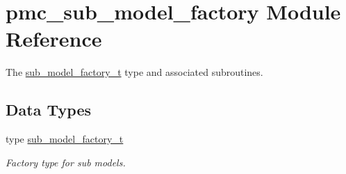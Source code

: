 \hypertarget{namespacepmc__sub__model__factory}{}\section{pmc\+\_\+sub\+\_\+model\+\_\+factory Module Reference}
\label{namespacepmc__sub__model__factory}


The \mbox{\hyperlink{structpmc__sub__model__factory_1_1sub__model__factory__t}{sub\+\_\+model\+\_\+factory\+\_\+t}} type and associated subroutines.  


\subsection*{Data Types}
\begin{DoxyCompactItemize}
\item 
type \mbox{\hyperlink{structpmc__sub__model__factory_1_1sub__model__factory__t}{sub\+\_\+model\+\_\+factory\+\_\+t}}
\begin{DoxyCompactList}\small\item\em Factory type for sub models. \end{DoxyCompactList}\end{DoxyCompactItemize}
